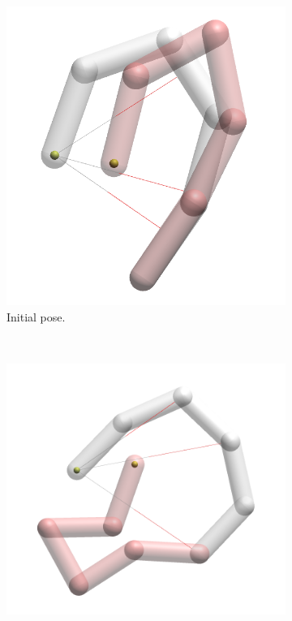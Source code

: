 \begin{figure}[h]
    \centering
    \begin{subfigure}[b]{0.22\textwidth}
        \includegraphics[width=\textwidth]{Figures/arm_noDivergence.png}
        \caption{Initial pose.}
        \label{subfig:divergenceInitial}
    \end{subfigure}
    ~
    \begin{subfigure}[b]{0.3\textwidth}
        \includegraphics[width=\textwidth]{Figures/arm_divergence.png}

\end{subfigure}
\end{figure}
